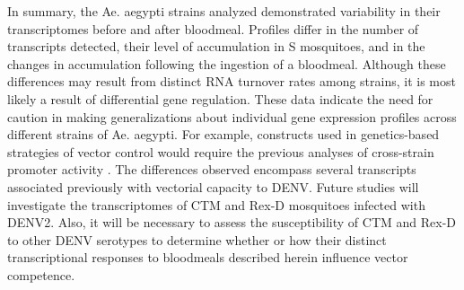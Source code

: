 In summary, the Ae. aegypti strains analyzed demonstrated variability in their transcriptomes before and after bloodmeal. Profiles differ in the number of transcripts detected, their level of accumulation in S mosquitoes, and in the changes in accumulation following the ingestion of a bloodmeal. Although these differences may result from distinct RNA turnover rates among strains, it is most likely a result of differential gene regulation. These data indicate the need for caution in making generalizations about individual gene expression profiles across different strains of Ae. aegypti. For example, constructs used in genetics-based strategies of vector control would require the previous analyses of cross-strain promoter activity \cite{James2011}. The differences observed encompass several transcripts associated previously with vectorial capacity to DENV. Future studies will investigate the transcriptomes of CTM and Rex-D mosquitoes infected with DENV2. Also, it will be necessary to assess the susceptibility of CTM and Rex-D to other DENV serotypes to determine whether or how their distinct transcriptional responses to bloodmeals described herein influence vector competence.